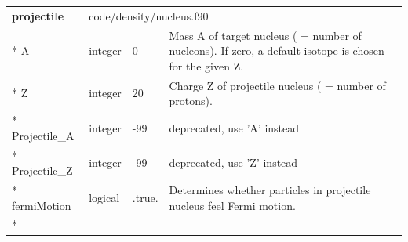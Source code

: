 \documentclass{article}
\begin{document}
\begin{longtable}{llll}
\toprule
\textbf{\large{projectile}} & \multicolumn{3}{l}{\footnotesize{code/density/nucleus.f90}}\\*
\midrule
\endfirsthead
\midrule
\endhead
A & \begin{minipage}[t]{2cm}integer\end{minipage} & \begin{minipage}[t]{2cm}0\end{minipage} & \begin{minipage}[t]{12cm}Mass A of target nucleus ( = number of nucleons). If zero, a default isotope is chosen for the given Z.\end{minipage}\\*
\midrule
Z & \begin{minipage}[t]{2cm}integer\end{minipage} & \begin{minipage}[t]{2cm}20\end{minipage} & \begin{minipage}[t]{12cm}Charge Z of projectile nucleus ( = number of protons).\end{minipage}\\*
\midrule
Projectile\_A & \begin{minipage}[t]{2cm}integer\end{minipage} & \begin{minipage}[t]{2cm}-99\end{minipage} & \begin{minipage}[t]{12cm}deprecated, use 'A' instead\end{minipage}\\*
\midrule
Projectile\_Z & \begin{minipage}[t]{2cm}integer\end{minipage} & \begin{minipage}[t]{2cm}-99\end{minipage} & \begin{minipage}[t]{12cm}deprecated, use 'Z' instead\end{minipage}\\*
\midrule
fermiMotion & \begin{minipage}[t]{2cm}logical\end{minipage} & \begin{minipage}[t]{2cm}.true.\end{minipage} & \begin{minipage}[t]{12cm}Determines whether particles in projectile nucleus feel Fermi motion.\end{minipage}\\*

\end{longtable}
\end{document}
